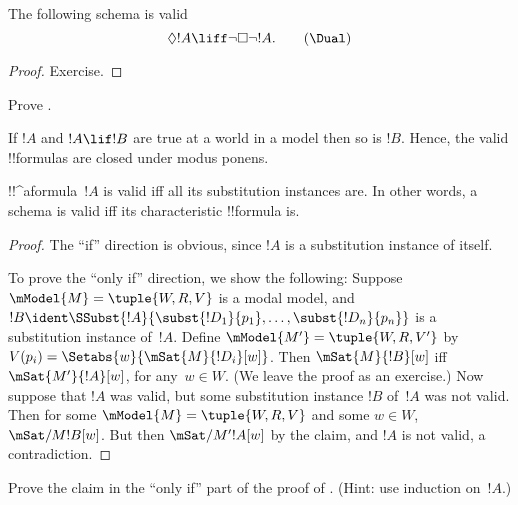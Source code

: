 \documentclass[../../../include/open-logic-section]{subfiles}
\begin{document}
\begin{prop}
  The following schema \Dual{} is valid
  \begin{equation}
  \Diamond !A \liff \lnot\Box\lnot !A. \tag{\Dual}
  \end{equation}
\end{prop}

\begin{proof}
  Exercise.
\end{proof}

\begin{prob}
  Prove .
\end{prob}

\begin{prop}
  If $!A$ and $!A \lif !B$ are true at a world in a model
  then so is $!B$. Hence, the valid !!{formula}s are closed under
  modus ponens.
\end{prop}

\begin{prop}
  !!^a{formula}~$!A$ is valid iff all its substitution instances
  are. In other words, a schema is valid iff its characteristic
  !!{formula} is.
\end{prop}

\begin{proof}
  The ``if'' direction is obvious, since $!A$ is a substitution
  instance of itself.

  To prove the ``only if'' direction, we show the following: Suppose
  $\mModel{M} = \tuple{W, R, V}$ is a modal model, and $!B \ident
  \SSubst{!A}{\subst{!D_1}{p_1},\dots,\subst{!D_n}{p_n}}$ is a
  substitution instance of~$!A$. Define $\mModel{M'} = \tuple{W, R,
    V'}$ by $V(p_i) = \Setabs{w}{\mSat{M}{!D_i}[w]}$.  Then
  $\mSat{M}{!B}[w]$ iff $\mSat{M'}{!A}[w]$, for any~$w \in W$. (We
  leave the proof as an exercise.) Now suppose that $!A$ was valid,
  but some substitution instance $!B$ of~$!A$ was not valid. Then for
  some $\mModel{M} = \tuple{W, R, V}$ and some $w \in W$,
  $\mSat/{M}{!B}[w]$. But then $\mSat/{M'}{!A}[w]$ by the claim, and
  $!A$ is not valid, a contradiction.
\end{proof}

\begin{prob}
  Prove the claim in the ``only if'' part of the proof of
  . (Hint: use induction
  on~$!A$.)
\end{prob}
\end{document}

